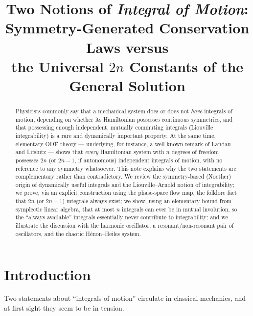 \documentclass[11pt]{article}
\title{Two Notions of \emph{Integral of Motion}:\\
Symmetry-Generated Conservation Laws versus\\
the Universal $2n$ Constants of the General Solution}
\author{}
\date{}
\theoremstyle{definition}
\theoremstyle{remark}
\begin{document}
\maketitle

\begin{abstract}
Physicists commonly say that a mechanical system does or does not \emph{have}
integrals of motion, depending on whether its Hamiltonian possesses continuous
symmetries, and that possessing enough independent, mutually commuting
integrals (Liouville integrability) is a rare and dynamically important
property. At the same time, elementary ODE theory --- underlying, for
instance, a well-known remark of Landau and Lifshitz --- shows that
\emph{every} Hamiltonian system with $n$ degrees of freedom possesses $2n$
(or $2n-1$, if autonomous) independent integrals of motion, with no
reference to any symmetry whatsoever. This note explains why the two
statements are complementary rather than contradictory. We review the
symmetry-based (Noether) origin of dynamically useful integrals and the
Liouville--Arnold notion of integrability; we prove, via an explicit
construction using the phase-space flow map, the folklore fact that $2n$
(or $2n-1$) integrals always exist; we show, using an elementary bound
from symplectic linear algebra, that at most $n$ integrals can ever be in
mutual involution, so the ``always available'' integrals essentially never
contribute to integrability; and we illustrate the discussion with the
harmonic oscillator, a resonant/non-resonant pair of oscillators, and the
chaotic H\'enon--Heiles system.
\end{abstract}

\section{Introduction}

Two statements about ``integrals of motion'' circulate in classical
mechanics, and at first sight they seem to be in tension.
\end{document}
